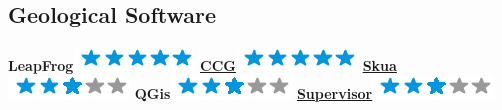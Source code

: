 \documentclass[]{friggeri-cv}
\begin{document}
\begin{aside}
  \section{Geological Software}
	\textbf{LeapFrog}\includegraphics[scale=0.40]{img/5stars.png}
	\href{http://www.ccgalberta.com/}{\textbf{CCG}}\includegraphics[scale=0.40]{img/5stars.png}
	\href{http://www.pdgm.com/products/skua-gocad/}{\textbf{Skua}}\includegraphics[scale=0.40]{img/3stars.png}
	\textbf{QGis}\includegraphics[scale=0.40]{img/3stars.png}
	\href{https://snowdengroup.com/software/supervisor/}{\textbf{Supervisor}}\includegraphics[scale=0.40]{img/3stars.png}
	~
    ~
\end{aside}
~
\end{document}
